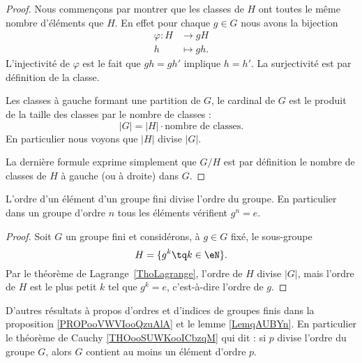 \begin{proof}
	Nous commençons par montrer que les classes de \( H\) ont toutes le même nombre d'éléments que \( H\). En effet pour chaque \( g\in G\) nous avons la bijection
	\begin{equation}
		\begin{aligned}
			\varphi\colon H & \to gH      \\
			h               & \mapsto gh.
		\end{aligned}
	\end{equation}
	L'injectivité de \( \varphi\) est le fait que \( gh=gh'\) implique \( h=h'\). La surjectivité est par définition de la classe.

	Les classes à gauche formant une partition de \( G\), le cardinal de \( G\) est le produit de la taille des classes par le nombre de classes :
	\begin{equation}
		| G |=| H |\cdot\text{nombre de classes}.
	\end{equation}
	En particulier nous voyons que \( | H |\) divise \( | G |\).

	La dernière formule exprime simplement que \( G/H\) est par définition le nombre de classes de \( H\) à gauche (ou à droite) dans \( G\).
\end{proof}

\begin{corollary}       \label{CorpZItFX}
	L'ordre d'un élément d'un groupe fini divise l'ordre du groupe. En particulier dans un groupe d'ordre \( n\) tous les éléments vérifient \( g^n=e\).
\end{corollary}

\begin{proof}
	Soit \( G\) un groupe fini et considérons, à \( g \in G \) fixé, le sous-groupe
	\begin{equation}
		H=\{ g^k\tq k\in\eN \}.
	\end{equation}
	Par le théorème de Lagrange~\ref{ThoLagrange}, l'ordre de \( H\) divise \( | G |\), mais l'ordre de \( H\) est le plus petit \( k\) tel que \( g^k=e\), c'est-à-dire l'ordre de \( g\).
\end{proof}

D'autres résultats à propos d'ordres et d'indices de groupes finis dans la proposition \ref{PROPooVWVIooQzuAlA} et le lemme \ref{LemqAUBYn}. En particulier le théorème de Cauchy \ref{THOooSUWKooICbzqM} qui dit : si \( p\) divise l'ordre du groupe \( G\), alors \( G\) contient au moins un élément d'ordre \( p\).

